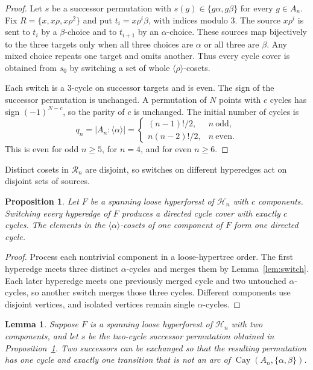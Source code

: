\documentclass[4pt]{article} %
\newtheorem{lemma}[theorem]{Lemma}
\newtheorem{proposition}[theorem]{Proposition}
\newcommand{\la}{\langle}
\newcommand{\ra}{\rangle}
\begin{document}
\begin{proof}
Let $s$ be a successor permutation with
$s(g)\in\{g\alpha,g\beta\}$ for every $g\in A_n$. Fix
$R=\{x,x\rho,x\rho^2\}$ and put $t_i=x\rho^i\beta$, with indices modulo
$3$. The source $x\rho^i$ is sent to $t_i$ by a $\beta$-choice and to
$t_{i+1}$ by an $\alpha$-choice. These sources map bijectively to the three
targets only when all three choices are $\alpha$ or all three are $\beta$.
Any mixed choice repeats one target and omits another. Thus every cycle cover
is obtained from $s_0$ by switching a set of whole
$\la\rho\ra$-cosets.

Each switch is a $3$-cycle on successor targets and is even. The sign of the
successor permutation is unchanged. A permutation of $N$ points with $c$
cycles has sign $(-1)^{N-c}$, so the parity of $c$ is unchanged. The initial
number of cycles is
\begin{equation}\label{eq:qn}
 q_n=|A_n:\la\alpha\ra|=
 \begin{cases}
  (n-1)!/2,& n\ \text{odd},\\[2mm]
  n(n-2)!/2,& n\ \text{even}.
 \end{cases}
\end{equation}
This is even for odd $n\geq5$, for $n=4$, and for even $n\geq6$.
\end{proof}

Distinct cosets in $\mathcal R_n$ are disjoint, so switches on different
hyperedges act on disjoint sets of sources.

\begin{proposition}\label{prop:forest-cover}
Let $F$ be a spanning loose hyperforest of $\mathcal H_n$ with $c$
components. Switching every hyperedge of $F$ produces a directed cycle cover
with exactly $c$ cycles. The elements in the $\la\alpha\ra$-cosets of one
component of $F$ form one directed cycle.
\end{proposition}

\begin{proof}
Process each nontrivial component in a loose-hypertree order. The first
hyperedge meets three distinct $\alpha$-cycles and merges them by
Lemma~\ref{lem:switch}. Each later hyperedge meets one previously merged
cycle and two untouched $\alpha$-cycles, so another switch merges those
three cycles. Different components use disjoint vertices, and isolated
vertices remain single $\alpha$-cycles.
\end{proof}

\begin{lemma}\label{lem:splice}
Suppose $F$ is a spanning loose hyperforest of $\mathcal H_n$ with two
components, and let $s$ be the two-cycle successor permutation obtained in
Proposition~\ref{prop:forest-cover}. Two successors can be exchanged so that
the resulting permutation has one cycle and exactly one transition that is
not an arc of $\operatorname{Cay}(A_n,\{\alpha,\beta\})$.
\end{lemma}
\end{document}

